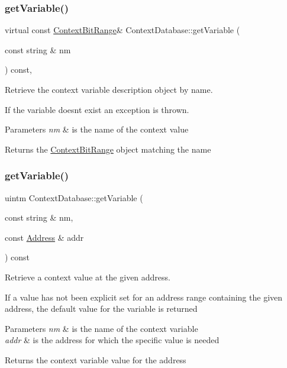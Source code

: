 \subsubsection{\texorpdfstring{getVariable()}{getVariable()}\hspace{0.1cm}{\footnotesize\ttfamily [2/3]}}
{\footnotesize\ttfamily virtual const \mbox{\hyperlink{class_context_bit_range}{Context\+Bit\+Range}}\& Context\+Database\+::get\+Variable (\begin{DoxyParamCaption}\item[{const string \&}]{nm }\end{DoxyParamCaption}) const\hspace{0.3cm}{\ttfamily [protected]}, {}}



Retrieve the context variable description object by name. 

If the variable doesn\textquotesingle{}t exist an exception is thrown. 
\begin{DoxyParams}{Parameters}
{\em nm} & is the name of the context value \\
\hline
\end{DoxyParams}
\begin{DoxyReturn}{Returns}
the \mbox{\hyperlink{class_context_bit_range}{Context\+Bit\+Range}} object matching the name 
\end{DoxyReturn}
\mbox{\label{class_context_database_a70c042b2aed6df6e5194905a25758fcd}} 
\subsubsection{\texorpdfstring{getVariable()}{getVariable()}\hspace{0.1cm}{\footnotesize\ttfamily [3/3]}}
{\footnotesize\ttfamily uintm Context\+Database\+::get\+Variable (\begin{DoxyParamCaption}\item[{const string \&}]{nm,  }\item[{const \mbox{\hyperlink{class_address}{Address}} \&}]{addr }\end{DoxyParamCaption}) const}



Retrieve a context value at the given address. 

If a value has not been explicit set for an address range containing the given address, the default value for the variable is returned 
\begin{DoxyParams}{Parameters}
{\em nm} & is the name of the context variable \\
\hline
{\em addr} & is the address for which the specific value is needed \\
\hline
\end{DoxyParams}
\begin{DoxyReturn}{Returns}
the context variable value for the address 
\end{DoxyReturn}


